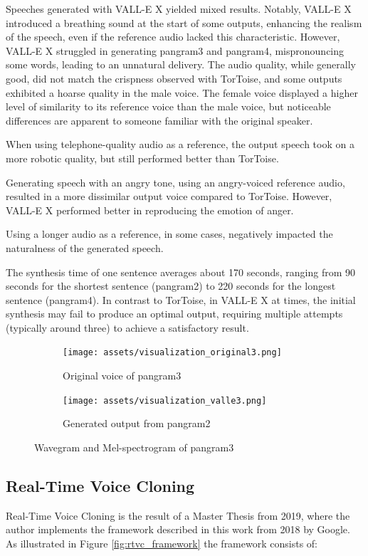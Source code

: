 Speeches generated with VALL-E X yielded mixed results. Notably, VALL-E X introduced a breathing sound at the start of some outputs, enhancing the realism of the speech, even if the reference audio lacked this characteristic. However, VALL-E X struggled in generating pangram3 and pangram4, mispronouncing some words, leading to an unnatural delivery. The audio quality, while generally good, did not match the crispness observed with TorToise, and some outputs exhibited a hoarse quality in the male voice. The female voice displayed a higher level of similarity to its reference voice than the male voice, but noticeable differences are apparent to someone familiar with the original speaker.

When using telephone-quality audio as a reference, the output speech took on a more robotic quality, but still performed better than TorToise.

Generating speech with an angry tone, using an angry-voiced reference audio, resulted in a more dissimilar output voice compared to TorToise. However, VALL-E X performed better in reproducing the emotion of anger.

Using a longer audio as a reference, in some cases, negatively impacted the naturalness of the generated speech.

The synthesis time of one sentence averages about 170 seconds, ranging from 90 seconds for the shortest sentence (pangram2) to 220 seconds for the longest sentence (pangram4). In contrast to TorToise, in VALL-E X at times, the initial synthesis may fail to produce an optimal output, requiring multiple attempts (typically around three) to achieve a satisfactory result.

\begin{figure}
\centering
\begin{subfigure}{0.49\textwidth}
\centering
\texttt{[image: assets/visualization\_original3.png]}
\caption{Original voice of pangram3}
\label{fig:visualization_original3}
\end{subfigure}
\begin{subfigure}{0.49\textwidth}
\centering
\texttt{[image: assets/visualization\_valle3.png]}
\caption{Generated output from pangram2}
\label{fig:visualization_valle3}
\end{subfigure}
\caption{Wavegram and Mel-spectrogram of pangram3}
\label{fig:visualization_valle}
\end{figure}

\subsection{Real-Time Voice Cloning}
Real-Time Voice Cloning is the result of a Master Thesis \cite{jemine2019master} from 2019, where the author implements the framework described in this work \cite{jia2018transfer} from 2018 by Google.
As illustrated in Figure \ref{fig:rtvc_framework} the framework consists of:

